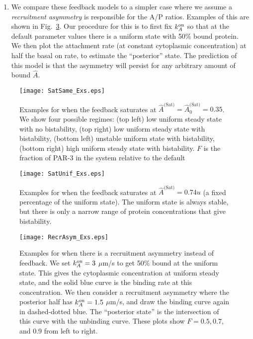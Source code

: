 \documentclass[11pt]{article}
\newcommand{\6}[1]{#1_{\text{6}}}
\newcommand{\3}[1]{#1_{\text{3}}}
\newcommand{\Sat}[1]{#1^\text{(Sat)}}
\begin{document}
\begin{enumerate}
\item We compare these feedback models to a simpler case where we assume a \emph{recruitment asymmetry} is responsible for the A/P ratios. Examples of this are shown in Fig.\ \ref{fig:RecAEx}. Our procedure for this is to first fix $k^\text{on}_A$ so that at the default parameter values there is a uniform state with 50\% bound protein. We then plot the attachment rate (at constant cytoplasmic concentration) at half the basal on rate, to estimate the ``posterior'' state. The prediction of this model is that the asymmetry will persist for any arbitrary amount of bound $\hat A$.
\end{enumerate}

\begin{figure}
\centering
\texttt{[image: SatSame\_Exs.eps]}
\caption{\label{fig:SatSameEx}Examples for when the feedback saturates at $\Sat{\hat A}=\Sat{\hat A}_0=0.35$. We show four possible regimes: (top left) low uniform steady state with no bistability, (top right) low uniform steady state with bistability, (bottom left) unstable uniform state with bistability, (bottom right) high uniform steady state with bistability. $F$ is the fraction of PAR-3 in the system relative to the default}
\end{figure}

\begin{figure}
\centering
\texttt{[image: SatUnif\_Exs.eps]}
\caption{\label{fig:SatUnifEx}Examples for when the feedback saturates at $\Sat{\hat A}=0.74u$ (a fixed percentage of the uniform state). The uniform state is always stable, but there is only a narrow range of protein concentrations that give bistability.  }
\end{figure}


\begin{figure}
\centering
\texttt{[image: RecrAsym\_Exs.eps]}
\caption{\label{fig:RecAEx}Examples for when there is a recruitment asymmetry instead of feedback. We set $k^\text{on}_A=3$ $\mu$m/s to get 50\% bound at the uniform state. This gives the cytoplasmic concentration at uniform steady state, and the solid blue curve is the binding rate at this concentration. We then consider a recruitment asymmetry where the posterior half has $k^\text{on}_A=1.5$ $\mu$m/s, and draw the binding curve again in dashed-dotted blue. The ``posterior state'' is the intersection of this curve with the unbinding curve. These plots show $F=0.5,0.7$, and 0.9 from left to right.}
\end{figure}
\end{document}
